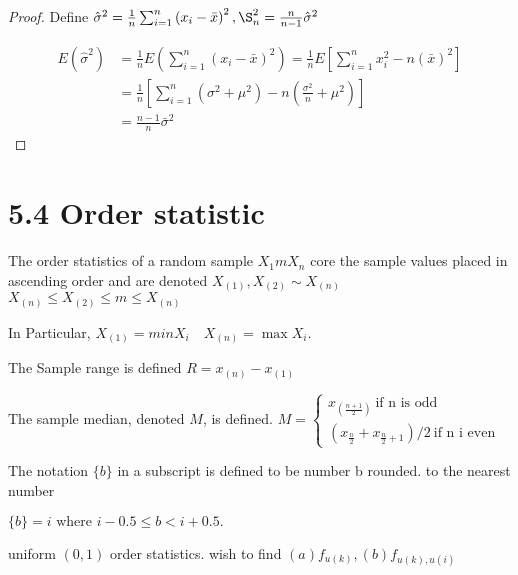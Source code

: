\documentclass[10pt]{article}
\begin{document}
\begin{proof}
  Define $\hat{\sigma}^{2}=\frac{1}{n} \sum_{i=1}^{n}\left(x_{i}-\bar{x}\right)^{2}, \S_{n}^{2}=\frac{n}{n-1} \hat{\sigma}^{2}$

$$
\begin{aligned}
E\left(\hat{\sigma}^{2}\right) & =\frac{1}{n} E\left(\sum_{i=1}^{n}\left(x_{i}-\bar{x}\right)^{2}\right)=\frac{1}{n} E\left[\sum_{i=1}^{n} x_{i}^{2}-n(\bar{x})^{2}\right] \\
& =\frac{1}{n}\left[\sum_{i=1}^{n}\left(\sigma^{2}+\mu^{2}\right)-n\left(\frac{\sigma^{2}}{n}+\mu^{2}\right)\right] \\
& =\frac{n-1}{n} \bar{\sigma}^{2}
\end{aligned}
$$
\end{proof}

\section*{5.4 Order statistic}

\begin{definition}
  The order statistics of a random sample $X_{1} m X_{n}$ core the sample values placed in ascending order and are denoted $X_{(1)}, X_{(2)} \sim X_{(n)}$
  $
  X_{(n)} \leq X_{(2)} \leq m \leq X_{(n)}
  $
\end{definition}



In Particular, $X_{(1)}=minX_{i} \quad X_{(n)}=\max X_{i}$.

The Sample range is defined $R=x_{(n)}-x_{(1)}$

The sample median, denoted $M$, is defined. $M=\left\{\begin{array}{l}x_{\left(\frac{n+1}{2}\right)} \ \text{if n is odd} \\ (x_{\frac{n}{2}}+x_{\frac{n}{2}+1})/2 \ \text{if n i even} \end{array}\right.$



The notation $\{b\}$ in a subscript is defined to be number b rounded. to the nearest number


\begin{example}
  $
\{b\}=i \text { where } i-0.5 \leq b<i+0.5 \text {. }
$
\end{example}

\begin{example}
  uniform $(0,1)$ order statistics. wish to find $(a) f_{u(k)},(b) f_{u(k), u(i)}$

\end{example}
\end{document}
